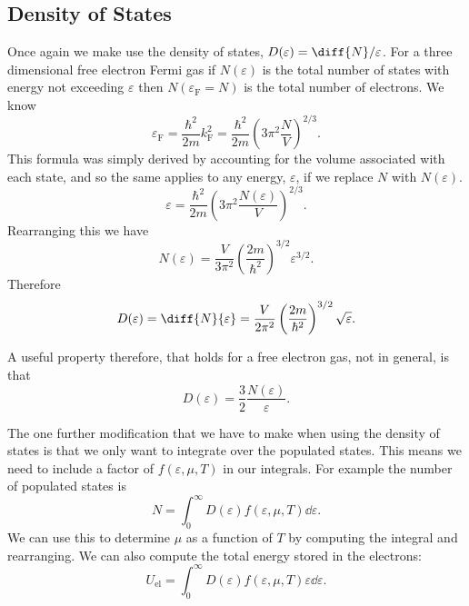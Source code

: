 \documentclass[fleqn]{NotesClass}
\newcommand*{\fermi}{\mathrm{F}}
\begin{document}
    \subsection{Density of States}
    Once again we make use the density of states, \(D(\varepsilon) = \diff{N}/{\varepsilon}\).
    For a three dimensional free electron Fermi gas if \(N(\varepsilon)\) is the total number of states with energy not exceeding \(\varepsilon\) then \(N(\varepsilon_{\fermi} = N)\) is the total number of electrons.
    We know
    \begin{equation}
        \varepsilon_{\fermi} = \frac{\hbar^2}{2m}k_{\fermi}^2 = \frac{\hbar^2}{2m}(3\pi^2\frac{N}{V})^{2/3}.
    \end{equation}
    This formula was simply derived by accounting for the volume associated with each state, and so the same applies to any energy, \(\varepsilon\), if we replace \(N\) with \(N(\varepsilon)\).
    \begin{equation}
        \varepsilon = \frac{\hbar^2}{2m}\left( 3\pi^2\frac{N(\varepsilon)}{V} \right)^{2/3}.
    \end{equation}
    Rearranging this we have
    \begin{equation}
        N(\varepsilon) = \frac{V}{3\pi^2} \left( \frac{2m}{\hbar^2} \right)^{3/2} \varepsilon^{3/2}.
    \end{equation}
    Therefore
    \begin{equation}
        D(\varepsilon) = \diff{N}{\varepsilon} = \frac{V}{2\pi^2} \left( \frac{2m}{\hbar^2} \right)^{3/2} \sqrt{\varepsilon}.
    \end{equation}
    
    A useful property therefore, that holds for a free electron gas, not in general, is that
    \begin{equation}
        D(\varepsilon) = \frac{3}{2}\frac{N(\varepsilon)}{\varepsilon}.
    \end{equation}
    
    The one further modification that we have to make when using the density of states is that we only want to integrate over the populated states.
    This means we need to include a factor of \(f(\varepsilon, \mu, T)\) in our integrals.
    For example the number of populated states is
    \begin{equation}
        N = \int_{0}^{\infty} D(\varepsilon) f(\varepsilon, \mu, T) \dd{\varepsilon}.
    \end{equation}
    We can use this to determine \(\mu\) as a function of \(T\) by computing the integral and rearranging.
    We can also compute the total energy stored in the electrons:
    \begin{equation}
        U_{\mathrm{el}} = \int_{0}^{\infty} D(\varepsilon)f(\varepsilon, \mu, T) \varepsilon \dd{\varepsilon}.
    \end{equation}
    
\end{document}
